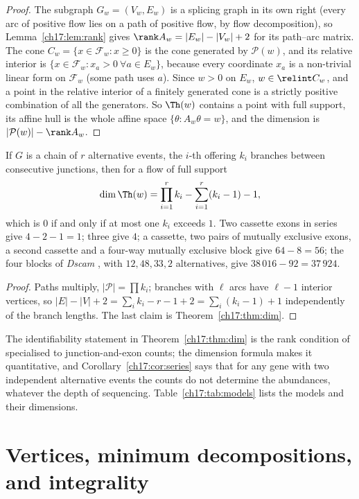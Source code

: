 \begin{proof}
The subgraph $G_w=(V_w,E_w)$ is a splicing graph in its own right (every arc of positive flow
lies on a path of positive flow, by flow decomposition), so Lemma~\ref{ch17:lem:rank} gives
$\rank A_w=|E_w|-|V_w|+2$ for its path--arc matrix. The cone $C_w=\{x\in\mathcal F_w:x\ge0\}$
is the cone generated by $\mathcal P(w)$, and its relative interior is $\{x\in\mathcal
F_w:x_a>0\ \forall a\in E_w\}$, because every coordinate $x_a$ is a non-trivial linear form
on $\mathcal F_w$ (some path uses $a$). Since $w>0$ on $E_w$, $w\in\relint C_w$, and a point
in the relative interior of a finitely generated cone is a strictly positive combination of
all the generators. So $\Th(w)$ contains a point with full support, its affine hull is the
whole affine space $\{\theta:A_w\theta=w\}$, and the dimension is $|\mathcal P(w)|-\rank A_w$.
\end{proof}

\begin{corollary}\label{ch17:cor:series}
If $G$ is a chain of $r$ alternative events, the $i$-th offering $k_i$ branches between
consecutive junctions, then for a flow of full support
\[
  \dim\Th(w)=\prod_{i=1}^r k_i-\sum_{i=1}^r(k_i-1)-1 ,
\]
which is $0$ if and only if at most one $k_i$ exceeds $1$. Two cassette exons in series give
$4-2-1=1$; three give $4$; a cassette, two pairs of mutually exclusive exons, a second
cassette and a four-way mutually exclusive block give $64-8=56$; the four blocks of
\emph{Dscam} \cite{SCH00}, with $12,48,33,2$ alternatives, give $38\,016-92=37\,924$.
\end{corollary}

\begin{proof}
Paths multiply, $|\mathcal P|=\prod k_i$; branches with $\ell$ arcs have $\ell-1$ interior
vertices, so $|E|-|V|+2=\sum_i k_i-r-1+2=\sum_i(k_i-1)+1$ independently of the branch
lengths. The last claim is Theorem~\ref{ch17:thm:dim}.
\end{proof}

The identifiability statement in Theorem~\ref{ch17:thm:dim} is the rank condition of
\cite{HJXW09} specialised to junction-and-exon counts; the dimension formula makes it
quantitative, and Corollary~\ref{ch17:cor:series} says that for any gene with two independent
alternative events the counts do not determine the abundances, whatever the depth of
sequencing. Table~\ref{ch17:tab:models} lists the models and their dimensions.

\section{Vertices, minimum decompositions, and integrality}\label{ch17:sec:vertices}

